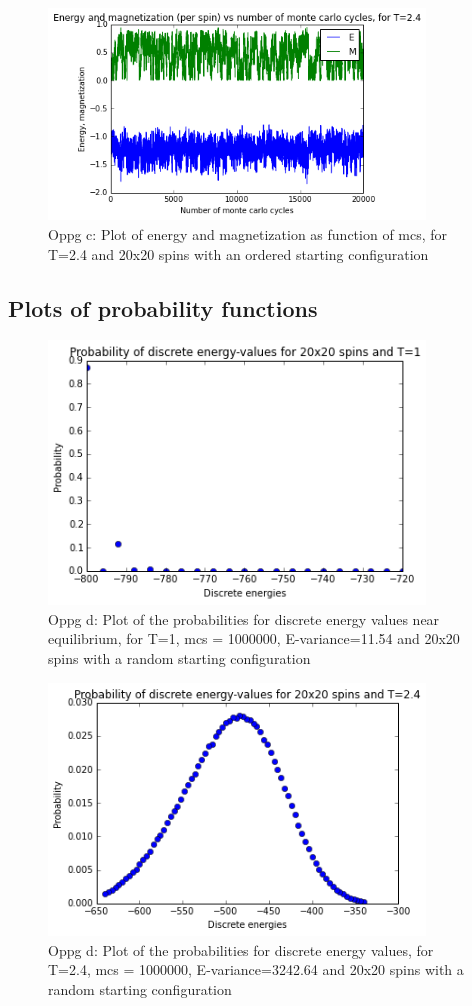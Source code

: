 \documentclass[twocolumn]{article}
\begin{document}
\begin{figure}[h!]
  \centering
  \caption{Oppg c: Plot of energy and magnetization as function of mcs, for T=2.4 and 20x20 spins with an ordered starting configuration}
  \includegraphics[width=10cm]{E_M_plot_c_4.png}
\end{figure}

\centering\subsection{Plots of probability functions}

\begin{figure}[H]
  \centering
  \caption{Oppg d: Plot of the probabilities for discrete energy values near equilibrium, for T=1, mcs = 1000000, E-variance=11.54 and 20x20 spins with a random starting configuration}
  \includegraphics[width=10cm]{FYS3150_Proj4d_plot.png}
\end{figure}

\begin{figure}[h!]
  \centering
  \caption{Oppg d: Plot of the probabilities for discrete energy values, for T=2.4, mcs = 1000000, E-variance=3242.64 and 20x20 spins with a random starting configuration}
  \includegraphics[width=10cm]{FYS3150_Proj4d_2_plot.png}
\end{figure}
\end{document}
